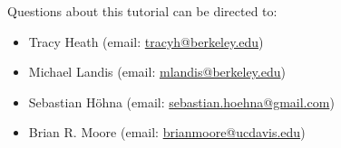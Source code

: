 Questions about this tutorial can be directed to: \\\vspace{-10mm}
\begin{itemize}
\item Tracy Heath (email: \href{mailto:tracyh@berkeley.edu}{tracyh@berkeley.edu}) \\\vspace{-8mm}
\item Michael Landis (email: \href{mailto:mlandis@berkeley.edu}{mlandis@berkeley.edu}) \\\vspace{-8mm} 
\item Sebastian H\"{o}hna (email: \href{mailto:sebastian.hoehna@gmail.com}{sebastian.hoehna@gmail.com}) \\\vspace{-8mm}
\item Brian R. Moore (email: \href{mailto:brianmoore@ucdavis.edu}{brianmoore@ucdavis.edu}) \\\vspace{-8mm}
\end{itemize}

\printbibliography[heading=relevref]

%
%
